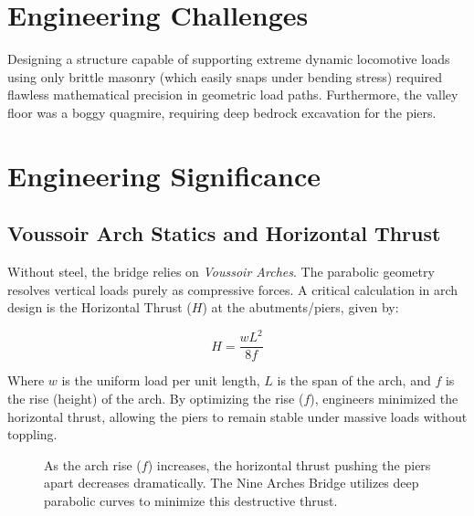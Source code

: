 \documentclass[12pt,a4paper]{report}
\begin{document}
	\section{Engineering Challenges}
	Designing a structure capable of supporting extreme dynamic locomotive loads using only brittle masonry (which easily snaps under bending stress) required flawless mathematical precision in geometric load paths. Furthermore, the valley floor was a boggy quagmire, requiring deep bedrock excavation for the piers.
	\newpage
	\section{Engineering Significance}
	
	\subsection{Voussoir Arch Statics and Horizontal Thrust}
	Without steel, the bridge relies on \textit{Voussoir Arches}. The parabolic geometry resolves vertical loads purely as compressive forces. A critical calculation in arch design is the Horizontal Thrust ($H$) at the abutments/piers, given by:
	
	\begin{equation}
		H = \frac{w L^2}{8 f}
	\end{equation}
	
	Where $w$ is the uniform load per unit length, $L$ is the span of the arch, and $f$ is the rise (height) of the arch. By optimizing the rise ($f$), engineers minimized the horizontal thrust, allowing the piers to remain stable under massive loads without toppling.
	
	\begin{figure}[H]
		\centering
		\caption{As the arch rise ($f$) increases, the horizontal thrust pushing the piers apart decreases dramatically. The Nine Arches Bridge utilizes deep parabolic curves to minimize this destructive thrust.}
		\label{fig:horizontal_thrust}
	\end{figure}
	
\end{document}
